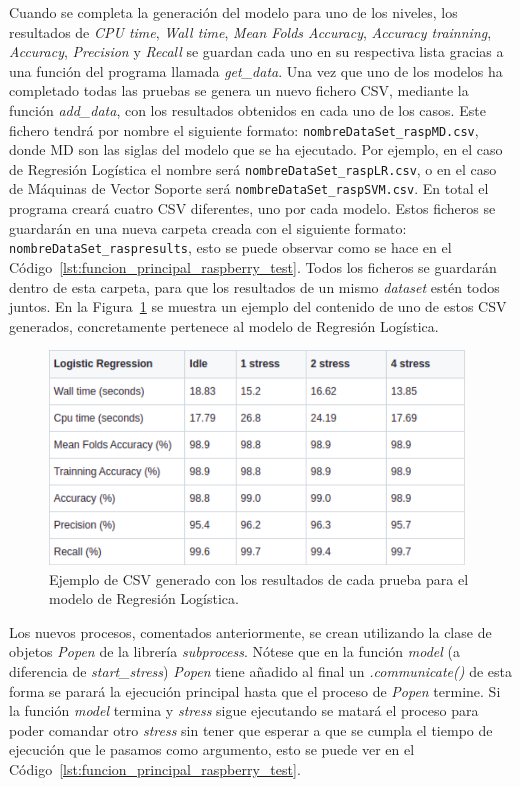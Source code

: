 \documentclass[a4paper, 12pt]{book}
\begin{document}
Cuando se completa la generación del modelo para uno de los niveles, los resultados de \textit{CPU time}, \textit{Wall time}, \textit{Mean Folds Accuracy}, \textit{Accuracy trainning}, \textit{Accuracy}, \textit{Precision} y \textit{Recall} se guardan cada uno en su respectiva lista gracias a una función del programa llamada \textit{get\_data}. Una vez que uno de los modelos ha completado todas las pruebas se genera un nuevo fichero CSV, mediante la función \textit{add\_data}, con los resultados obtenidos en cada uno de los casos.
Este fichero tendrá por nombre el siguiente formato: \texttt{nombreDataSet\_raspMD.csv}, donde MD son las siglas del modelo que se ha ejecutado. Por ejemplo, en el caso de Regresión Logística el nombre será \texttt{nombreDataSet\_raspLR.csv}, o en el caso de Máquinas de Vector Soporte será \texttt{nombreDataSet\_raspSVM.csv}. En total el programa creará cuatro CSV diferentes, uno por cada modelo. Estos ficheros se guardarán en una nueva carpeta creada con el siguiente formato: \texttt{nombreDataSet\_raspresults}, esto se puede observar como se hace en el Código~\ref{lst:funcion_principal_raspberry_test}. Todos los ficheros se guardarán dentro de esta carpeta, para que los resultados de un mismo \textit{dataset} estén todos juntos. En la Figura~\ref{fig:ejemplo_csv} se muestra un ejemplo del contenido de uno de estos CSV generados, concretamente pertenece al modelo de Regresión Logística.

\begin{figure}[htb]
  \centering
  \includegraphics[width=11cm, keepaspectratio]{img/ejemplo_csv3.png}
  \caption{Ejemplo de CSV generado con los resultados de cada prueba para el modelo de Regresión Logística.}\label{fig:ejemplo_csv}
\end{figure}

Los nuevos procesos, comentados anteriormente, se crean utilizando la clase de objetos \textit{Popen} de la librería \textit{subprocess}. Nótese que en la función \textit{model} (a diferencia de \textit{start\_stress}) \textit{Popen} tiene añadido al final un \textit{.communicate()} de esta forma se parará la ejecución principal hasta que el proceso de \textit{Popen} termine. Si la función \textit{model} termina y \textit{stress} sigue ejecutando se matará el proceso para poder comandar otro \textit{stress} sin tener que esperar a que se cumpla el tiempo de ejecución que le pasamos como argumento, esto se puede ver en el Código~\ref{lst:funcion_principal_raspberry_test}.
\end{document}
